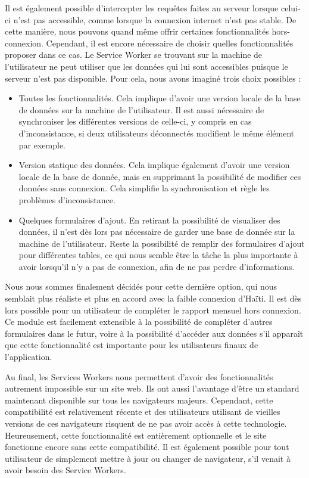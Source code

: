 \documentclass{EPL-master-thesis-covers-FR}
\begin{document}
				Il est également possible d'intercepter les requêtes faites au serveur lorsque celui-ci n'est pas accessible, comme lorsque la connexion internet n'est pas stable. De cette manière, nous pouvons quand même offrir certaines fonctionnalités hors-connexion. Cependant, il est encore nécessaire de choisir quelles fonctionnalités proposer dans ce cas. Le Service Worker se trouvant sur la machine de l'utilisateur ne peut utiliser que les données qui lui sont accessibles puisque le serveur n'est pas disponible. Pour cela, nous avons imaginé trois choix possibles :

				\begin{itemize}
					\item Toutes les fonctionnalités. Cela implique d'avoir une version locale de la base de données sur la machine de l'utilisateur. Il est aussi nécessaire de synchroniser les différentes versions de celle-ci, y compris en cas d'inconsistance, si deux utilisateurs déconnectés modifient le même élément par exemple.
					\item Version statique des données. Cela implique également d'avoir une version locale de la base de donnée, mais en supprimant la possibilité de modifier ces données sans connexion. Cela simplifie la synchronisation et règle les problèmes d'inconsistance.
					\item Quelques formulaires d'ajout. En retirant la possibilité de visualiser des données, il n'est dès lors pas nécessaire de garder une base de donnée sur la machine de l'utilisateur. Reste la possibilité de remplir des formulaires d'ajout pour différentes tables, ce qui nous semble être la tâche la plus importante à avoir lorsqu'il n'y a pas de connexion, afin de ne pas perdre d'informations.
				\end{itemize}

				Nous nous sommes finalement décidés pour cette dernière option, qui nous semblait plus réaliste et plus en accord avec la faible connexion d'Haïti. Il est dès lors possible pour un utilisateur de compléter le rapport mensuel hors connexion. Ce module est facilement extensible à la possibilité de compléter d'autres formulaires dans le futur, voire à la possibilité d'accéder aux données s'il apparaît que cette fonctionnalité est importante pour les utilisateurs finaux de l'application.

				Au final, les Services Workers nous permettent d'avoir des fonctionnalités autrement impossible sur un site web. Ils ont aussi l'avantage d'être un standard maintenant disponible sur tous les navigateurs majeurs. Cependant, cette compatibilité est relativement récente et des utilisateurs utilisant de vieilles versions de ces navigateurs risquent de ne pas avoir accès à cette technologie. Heureusement, cette fonctionnalité est entièrement optionnelle et le site fonctionne encore sans cette compatibilité. Il est également possible pour tout utilisateur de simplement mettre à jour ou changer de navigateur, s'il venait à avoir besoin des Service Workers.
\end{document}
